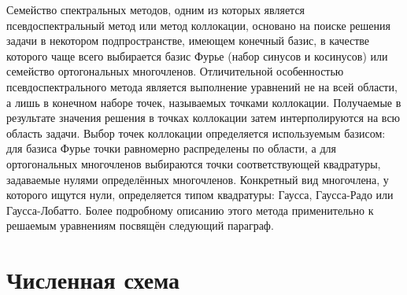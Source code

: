 \documentclass[12pt, a4paper]{report}
\begin{document}
Семейство спектральных методов, одним из которых является псевдоспектральный метод или метод коллокации, основано на поиске решения задачи в некотором подпространстве, имеющем конечный базис, в качестве которого чаще всего выбирается базис Фурье (набор синусов и косинусов) или семейство ортогональных многочленов. 
Отличительной особенностью псевдоспектрального метода является выполнение уравнений не на всей области, а лишь в конечном наборе точек, называемых точками коллокации. Получаемые в результате значения решения в точках коллокации затем интерполируются на всю область задачи. 
Выбор точек коллокации определяется используемым базисом: для базиса Фурье точки равномерно распределены по области, а для ортогональных многочленов выбираются точки соответствующей квадратуры, задаваемые нулями определённых многочленов. Конкретный вид многочлена, у которого ищутся нули, определяется типом квадратуры: Гаусса, Гаусса-Радо или Гаусса-Лобатто. Более подробному описанию этого метода применительно к решаемым уравнениям посвящён следующий параграф.


\section{Численная схема}
\end{document}
